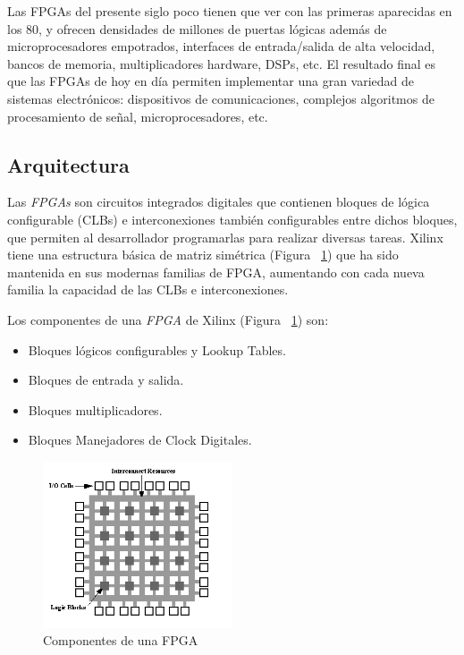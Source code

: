 	Las FPGAs del presente siglo poco tienen que ver con las primeras aparecidas en los 80, y ofrecen densidades de millones de puertas lógicas además
	de microprocesadores empotrados, interfaces de entrada/salida de alta velocidad, bancos de memoria, multiplicadores hardware, DSPs, etc. El
	resultado final es que las FPGAs de hoy en día permiten implementar una gran variedad de sistemas electrónicos: dispositivos de comunicaciones,
	complejos algoritmos de procesamiento de señal, microprocesadores, etc.

	\subsection{Arquitectura}
    Las \textit{FPGAs} son circuitos integrados digitales que contienen bloques de lógica configurable (CLBs) e interconexiones también configurables entre dichos
	bloques, que permiten al desarrollador programarlas para realizar diversas tareas. Xilinx tiene una estructura básica de matriz simétrica (Figura
	~\ref{fig:compfpga}) que ha sido mantenida en sus modernas familias de FPGA, aumentando con cada nueva familia la capacidad de las CLBs e
	interconexiones.
	
	Los componentes de una \textit{FPGA} de Xilinx (Figura ~\ref{fig:compfpga}) son:

	\begin {itemize}
	\item  Bloques lógicos configurables y Lookup Tables.
	\item  Bloques de entrada y salida.
	\item  Bloques multiplicadores.
	\item  Bloques Manejadores de Clock Digitales.
	\end {itemize}

	\begin{figure}[h!]
 	\begin{center}
   	\includegraphics[width=0.5\textwidth,keepaspectratio=true]{./images/fpga1a}
  	\caption{Componentes de una FPGA}
  	\label{fig:compfpga}
 	\end{center}
	\end{figure}

